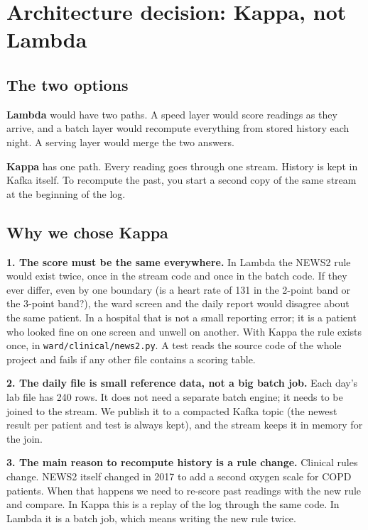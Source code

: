 \documentclass[11pt,a4paper]{article}
\begin{document}
\section{Architecture decision: Kappa, not Lambda}\label{sec:decision}

\subsection{The two options}

\hspace*{\parindent}\textbf{Lambda} would have two paths. A speed layer would score readings as they
arrive, and a batch layer would recompute everything from stored history each night.
A serving layer would merge the two answers.

\textbf{Kappa} has one path. Every reading goes through one stream. History is kept in
Kafka itself. To recompute the past, you start a second copy of the same stream at the
beginning of the log.

\subsection{Why we chose Kappa}

\hspace*{\parindent}\textbf{1. The score must be the same everywhere.} In Lambda the NEWS2 rule would
exist twice, once in the stream code and once in the batch code. If they ever differ,
even by one boundary (is a heart rate of 131 in the 2-point band or the 3-point band?),
the ward screen and the daily report would disagree about the same patient. In a
hospital that is not a small reporting error; it is a patient who looked fine on one
screen and unwell on another. With Kappa the rule exists once, in
\texttt{ward/clinical/news2.py}. A test reads the source code of the whole project and
fails if any other file contains a scoring table.

\textbf{2. The daily file is small reference data, not a big batch job.} Each day's lab
file has 240 rows. It does not need a separate batch engine; it needs to be joined to
the stream. We publish it to a compacted Kafka topic (the newest result per patient and
test is always kept), and the stream keeps it in memory for the join.

\textbf{3. The main reason to recompute history is a rule change.} Clinical rules
change. NEWS2 itself changed in 2017 to add a second oxygen scale for COPD patients.
When that happens we need to re-score past readings with the new rule and compare. In
Kappa this is a replay of the log through the same code. In Lambda it is a batch job,
which means writing the new rule twice.
\end{document}
